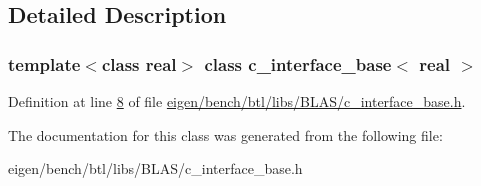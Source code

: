 \subsection{Detailed Description}
\subsubsection*{template$<$class real$>$\newline
class c\+\_\+interface\+\_\+base$<$ real $>$}



Definition at line \hyperlink{eigen_2bench_2btl_2libs_2_b_l_a_s_2c__interface__base_8h_source_l00008}{8} of file \hyperlink{eigen_2bench_2btl_2libs_2_b_l_a_s_2c__interface__base_8h_source}{eigen/bench/btl/libs/\+B\+L\+A\+S/c\+\_\+interface\+\_\+base.\+h}.



The documentation for this class was generated from the following file\+:\begin{DoxyCompactItemize}
\item 
eigen/bench/btl/libs/\+B\+L\+A\+S/c\+\_\+interface\+\_\+base.\+h\end{DoxyCompactItemize}
